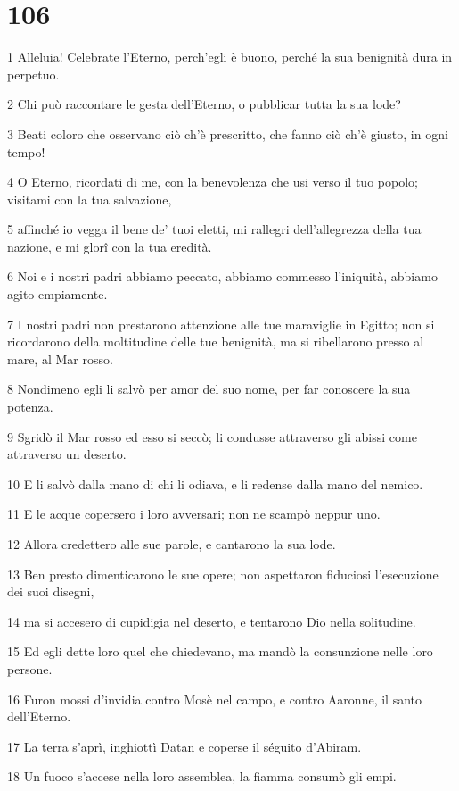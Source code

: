 \chapter{106}

\par 1 Alleluia! Celebrate l'Eterno, perch'egli è buono, perché la sua benignità dura in perpetuo.
\par 2 Chi può raccontare le gesta dell'Eterno, o pubblicar tutta la sua lode?
\par 3 Beati coloro che osservano ciò ch'è prescritto, che fanno ciò ch'è giusto, in ogni tempo!
\par 4 O Eterno, ricordati di me, con la benevolenza che usi verso il tuo popolo; visitami con la tua salvazione,
\par 5 affinché io vegga il bene de' tuoi eletti, mi rallegri dell'allegrezza della tua nazione, e mi glorî con la tua eredità.
\par 6 Noi e i nostri padri abbiamo peccato, abbiamo commesso l'iniquità, abbiamo agito empiamente.
\par 7 I nostri padri non prestarono attenzione alle tue maraviglie in Egitto; non si ricordarono della moltitudine delle tue benignità, ma si ribellarono presso al mare, al Mar rosso.
\par 8 Nondimeno egli li salvò per amor del suo nome, per far conoscere la sua potenza.
\par 9 Sgridò il Mar rosso ed esso si seccò; li condusse attraverso gli abissi come attraverso un deserto.
\par 10 E li salvò dalla mano di chi li odiava, e li redense dalla mano del nemico.
\par 11 E le acque copersero i loro avversari; non ne scampò neppur uno.
\par 12 Allora credettero alle sue parole, e cantarono la sua lode.
\par 13 Ben presto dimenticarono le sue opere; non aspettaron fiduciosi l'esecuzione dei suoi disegni,
\par 14 ma si accesero di cupidigia nel deserto, e tentarono Dio nella solitudine.
\par 15 Ed egli dette loro quel che chiedevano, ma mandò la consunzione nelle loro persone.
\par 16 Furon mossi d'invidia contro Mosè nel campo, e contro Aaronne, il santo dell'Eterno.
\par 17 La terra s'aprì, inghiottì Datan e coperse il séguito d'Abiram.
\par 18 Un fuoco s'accese nella loro assemblea, la fiamma consumò gli empi.
